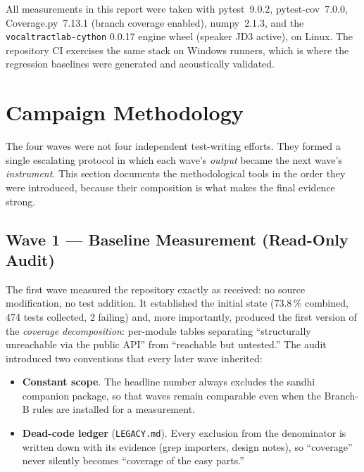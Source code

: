\documentclass[11pt,a4paper]{article}
\newcommand{\code}[1]{\texttt{#1}}
\newcommand{\pkg}[1]{\texttt{#1}}
\newcommand{\pct}[1]{{#1}\,\%}
\begin{document}
All measurements in this report were taken with pytest~9.0.2,
pytest-cov~7.0.0, Coverage.py~7.13.1 (branch coverage enabled),
numpy~2.1.3, and the \pkg{vocaltractlab-cython} 0.0.17 engine
wheel (speaker JD3 active), on Linux. The repository CI exercises
the same stack on Windows runners, which is where the regression
baselines were generated and acoustically validated.

\section{Campaign Methodology}
\label{sec:methodology}

The four waves were not four independent test-writing efforts. They
formed a single escalating protocol in which each wave's \emph{output}
became the next wave's \emph{instrument}. This section documents the
methodological tools in the order they were introduced, because their
composition is what makes the final evidence strong.

\subsection{Wave 1 --- Baseline Measurement (Read-Only Audit)}
\label{sec:wave1}

The first wave measured the repository exactly as received: no source
modification, no test addition. It established the initial state
(\pct{73.8} combined, 474 tests collected, 2 failing) and, more
importantly, produced the first version of the \emph{coverage
decomposition}: per-module tables separating ``structurally unreachable
via the public API'' from ``reachable but untested.'' The audit
introduced two conventions that every later wave inherited:

\begin{itemize}[leftmargin=1.4em, itemsep=0.15em]
  \item \textbf{Constant scope}. The headline number always excludes
        the sandhi companion package, so that waves remain comparable
        even when the Branch-B rules are installed for a measurement.
  \item \textbf{Dead-code ledger} (\code{LEGACY.md}). Every exclusion
        from the denominator is written down with its evidence (grep
        importers, design notes), so ``coverage'' never silently
        becomes ``coverage of the easy parts.''
\end{itemize}
\end{document}
